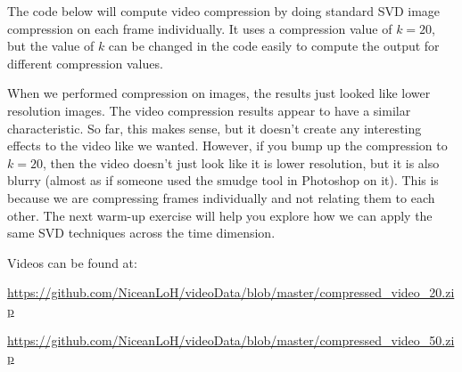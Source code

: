 The code below will compute video compression by doing standard SVD image compression on each frame individually. It uses a compression value of $k = 20$, but the value of $k$ can be changed in the code easily to compute the output for different compression values.


When we performed compression on images, the results just looked like lower resolution images. The video compression results appear to have a similar characteristic. So far, this makes sense, but it doesn't create any interesting effects to the video like we wanted. However, if you bump up the compression to $k = 20$, then the video doesn't just look like it is lower resolution, but it is also blurry (almost as if someone used the smudge tool in Photoshop on it). This is because we are compressing frames individually and not relating them to each other. The next warm-up exercise will help you explore how we can apply the same SVD techniques across the time dimension.

Videos can be found at:

\url{https://github.com/NiceanLoH/videoData/blob/master/compressed\_video\_20.zip}

\url{https://github.com/NiceanLoH/videoData/blob/master/compressed\_video\_50.zip}